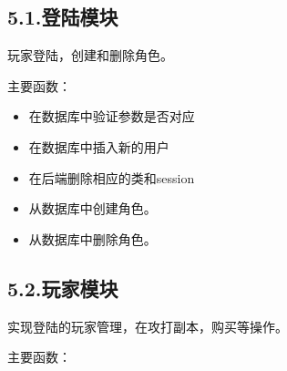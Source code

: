 \documentclass{article}
\begin{document}
\subsection{5.1.\hspace*{0.5em}登陆模块}\label{51}%

\noindent{}玩家登陆，创建和删除角色。%

主要函数：%

\begin{itemize}[noitemsep,topsep=\mdcompacttopsep]%

\item{}在数据库中验证参数是否对应%

\item{}在数据库中插入新的用户%

\item{}在后端删除相应的类和session%

\item{}从数据库中创建角色。%

\item{}从数据库中删除角色。%
\end{itemize}%

\subsection{5.2.\hspace*{0.5em}玩家模块}\label{52}%

\noindent{}实现登陆的玩家管理，在攻打副本，购买等操作。%

主要函数：%
\end{document}
